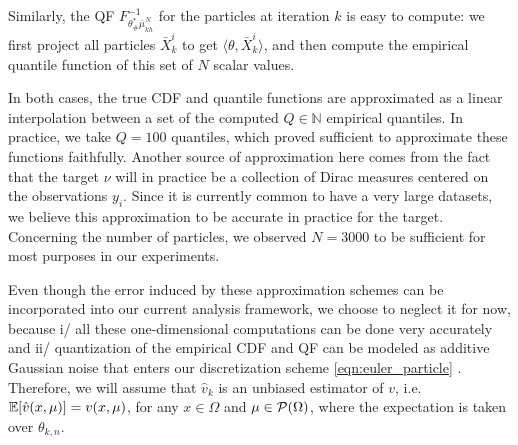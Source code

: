 Similarly, the QF $F^{-1}_{\theta^*_\#\bar{\mu}_{kh}^{N}}$ for the particles at iteration $k$ is easy to compute: we first project all particles $\bar{X}_k^i$ to get $\langle \theta, \bar{X}_k^i\rangle$, and then compute the empirical quantile function of this set of $N$ scalar values.

In both cases, the true CDF and quantile functions are approximated as a linear interpolation between a set of the computed $Q\in\mathbb{N}$ empirical quantiles. In practice, we take $Q=100$ quantiles, which proved sufficient to approximate these functions faithfully.
Another source of approximation here comes from the fact that the target $\nu$ will in practice be a collection of Dirac measures centered on the observations $y_i$. Since it is currently common to have a very large datasets, we believe this approximation to be accurate in practice for the target. Concerning the number of particles, we observed $N=3000$ to be sufficient for most purposes in our experiments.

Even though the error induced by these approximation schemes can be incorporated into our current analysis framework, we choose to neglect it for now, because i/ all these one-dimensional computations can be done very accurately and ii/ quantization of the empirical CDF and QF can be modeled as additive Gaussian noise that enters our discretization scheme \eqref{eqn:euler_particle} . Therefore, we will assume that $\hat{v}_k$ is an unbiased estimator of $v$, i.e.\ $\mathbb{E}[\hat{v}(x,\mu)] = v(x,\mu)$, for any $x\in \Omega$ and $\mu \in {\cal P}(\Omega)$, where the expectation is taken over $\theta_{k,n}$.



